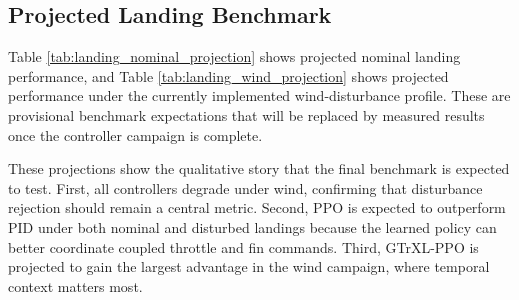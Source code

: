\documentclass[10pt,twocolumn]{article}
\begin{document}
\subsection{Projected Landing Benchmark}

Table \ref{tab:landing_nominal_projection} shows projected nominal landing performance, and Table \ref{tab:landing_wind_projection} shows projected performance under the currently implemented wind-disturbance profile. These are provisional benchmark expectations that will be replaced by measured results once the controller campaign is complete.

\begin{table}[!t]
\centering
\begin{minipage}[t]{0.48\textwidth}
\centering
{}
\label{tab:landing_nominal_projection}
\scriptsize
\setlength{\tabcolsep}{3pt}
\end{minipage}\hfill
\begin{minipage}[t]{0.48\textwidth}
\centering
{}
\label{tab:landing_wind_projection}
\scriptsize
\setlength{\tabcolsep}{2pt}
\end{minipage}
\end{table}

These projections show the qualitative story that the final benchmark is expected to test. First, all controllers degrade under wind, confirming that disturbance rejection should remain a central metric. Second, PPO is expected to outperform PID under both nominal and disturbed landings because the learned policy can better coordinate coupled throttle and fin commands. Third, GTrXL-PPO is projected to gain the largest advantage in the wind campaign, where temporal context matters most.
\end{document}
